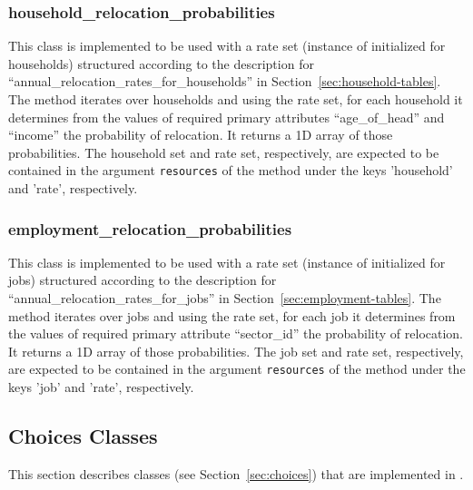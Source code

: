 \subsubsection{household_relocation_probabilities}
%
This class is implemented to be used with a rate set (instance of
 initialized for households) structured according to the
description for ``annual_relocation_rates_for_households'' in
Section~\ref{sec:household-tables}. The  method iterates over
households and using the rate set, for each household it determines from the
values of required primary attributes ``age_of_head'' and ``income'' the
probability of relocation. It returns a 1D array of those probabilities. The
household set and rate set, respectively, are expected to be contained in the argument
\verb|resources| of the  method under the keys 'household' and 'rate', respectively.

\subsubsection{employment_relocation_probabilities}
%
This class is implemented to be used with a rate set (instance of
 initialized for jobs) structured according to the description
for ``annual_relocation_rates_for_jobs'' in
Section~\ref{sec:employment-tables}. The  method iterates over
jobs and using the rate set, for each job it determines from the values of
required primary attribute ``sector_id'' the probability of relocation. It
returns a 1D array of those probabilities. The job set and rate set, respectively, are
expected to be contained in the argument \verb|resources| of the
 method under the keys 'job' and 'rate', respectively.

%
\subsection{Choices Classes}
%
\label{sec:urbansim-choices}
This section describes  classes (see
Section~\ref{sec:choices}) that are implemented in .

